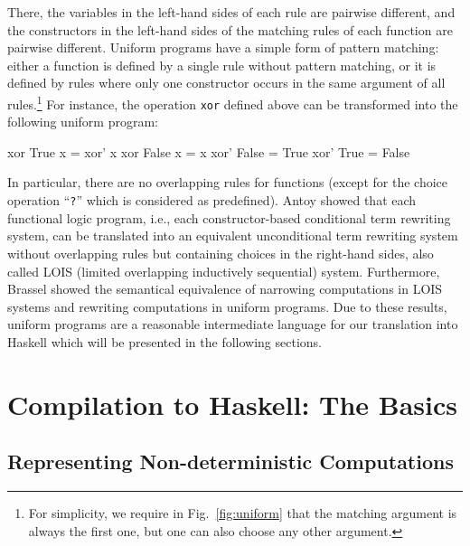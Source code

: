 \documentclass{llncs}
\newcommand{\code}[1]{\mbox{\small\texttt{#1}}}
\newcommand{\ccode}[1]{``\code{#1}''}
\begin{document}
There, the variables in the left-hand sides of each rule are pairwise
different, and
the constructors in the left-hand sides of the matching rules of each function
are pairwise different.
Uniform programs have a simple form of pattern matching:
either a function is defined by a single rule without pattern matching,
or it is defined by rules where only one constructor occurs in the same argument
of all rules.\footnote{For simplicity, we require in
Fig.~\ref{fig:uniform} that the matching argument is always the
first one, but one can also choose any other argument.}
For instance, the operation \code{xor} defined above can be transformed
into the following uniform program:
%
\begin{curry}
  xor True   x = xor' x
  xor False  x = x
  xor' False = True
  xor' True  = False
\end{curry}
%
In particular, there are no overlapping rules for functions
(except for the choice operation \ccode{?} which is considered as predefined).
Antoy \cite{Antoy01PPDP} showed that each functional logic program,
i.e., each constructor-based conditional term rewriting system,
can be translated into an equivalent unconditional term rewriting system
without overlapping rules but containing choices in the right-hand sides,
also called LOIS (limited overlapping inductively sequential) system.
Furthermore, Brassel \cite{Brassel11Thesis} showed the semantical
equivalence of narrowing computations in LOIS systems
and rewriting computations in uniform programs.
Due to these results, uniform programs are a reasonable intermediate
language for our translation into Haskell which will be presented
in the following sections.


\section{Compilation to Haskell: The Basics}
\label{sec:Compilation}

\subsection{Representing Non-deterministic Computations}
\end{document}
